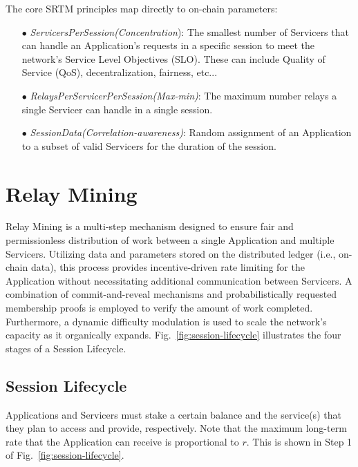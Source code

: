 \documentclass[runningheads]{llncs}
\begin{document}
The core SRTM principles map directly to on-chain parameters:
\begin{itemize}
  \item[$\bullet$] \textit{ServicersPerSession(Concentration}): The smallest number of Servicers that can handle an Application's requests in a specific session to meet the network's Service Level Objectives (SLO). These can include Quality of Service (QoS), decentralization, fairness, etc...
  \item[$\bullet$] \textit{RelaysPerServicerPerSession(Max-min)}: The maximum number relays a single Servicer can handle in a single session.
  \item[$\bullet$] \textit{SessionData(Correlation-awareness)}: Random assignment of an Application to a subset of valid Servicers for the duration of the session.
\end{itemize}

\section{Relay Mining}\label{relay-mining}

Relay Mining is a multi-step mechanism designed to ensure fair and permissionless distribution of work between a single Application and multiple Servicers. Utilizing data and parameters stored on the distributed ledger (i.e., on-chain data), this process provides incentive-driven rate limiting for the Application without necessitating additional communication between Servicers. A combination of commit-and-reveal mechanisms and probabilistically requested membership proofs is employed to verify the amount of work completed. Furthermore, a dynamic difficulty modulation is used to scale the network's capacity as it organically expands. Fig.~\ref{fig:session-lifecycle} illustrates the four stages of a Session Lifecycle.

\subsection{Session Lifecycle}

Applications and Servicers must stake a certain balance and the service(s) that they plan to access and provide, respectively. Note that the maximum long-term rate that the Application can receive is proportional to $r$. This is shown in Step 1 of Fig.~\ref{fig:session-lifecycle}.
\end{document}
